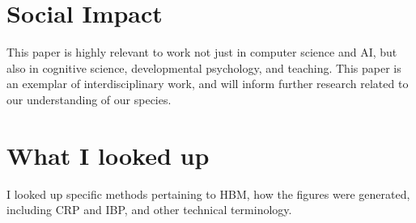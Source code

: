 \documentclass[12pt, letterpaper]{article}
\begin{document}
\section{Social Impact}
\label{sec:impact}
This paper is highly relevant to work not just in computer science and AI, but also in cognitive science, developmental psychology, and teaching. This paper is an exemplar of interdisciplinary work, and will inform further research related to our understanding of our species. 

\section{What I looked up}
\label{sec:looked up}
I looked up specific methods pertaining to HBM, how the figures were generated, including CRP and IBP, and other technical terminology. 


\end{document}
